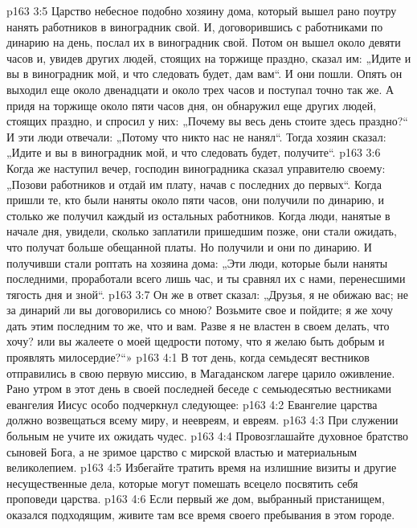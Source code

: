 \vs p163 3:5 Царство небесное подобно хозяину дома, который вышел рано поутру нанять работников в виноградник свой. И, договорившись с работниками по динарию на день, послал их в виноградник свой. Потом он вышел около девяти часов и, увидев других людей, стоящих на торжище праздно, сказал им: „Идите и вы в виноградник мой, и что следовать будет, дам вам“. И они пошли. Опять он выходил еще около двенадцати и около трех часов и поступал точно так же. А придя на торжище около пяти часов дня, он обнаружил еще других людей, стоящих праздно, и спросил у них: „Почему вы весь день стоите здесь праздно?“ И эти люди отвечали: „Потому что никто нас не нанял“. Тогда хозяин сказал: „Идите и вы в виноградник мой, и что следовать будет, получите“.
\vs p163 3:6 Когда же наступил вечер, господин виноградника сказал управителю своему: „Позови работников и отдай им плату, начав с последних до первых“. Когда пришли те, кто были наняты около пяти часов, они получили по динарию, и столько же получил каждый из остальных работников. Когда люди, нанятые в начале дня, увидели, сколько заплатили пришедшим позже, они стали ожидать, что получат больше обещанной платы. Но получили и они по динарию. И получивши стали роптать на хозяина дома: „Эти люди, которые были наняты последними, проработали всего лишь час, и ты сравнял их с нами, перенесшими тягость дня и зной“.
\vs p163 3:7 Он же в ответ сказал: „Друзья, я не обижаю вас; не за динарий ли вы договорились со мною? Возьмите свое и пойдите; я же хочу дать этим последним то же, что и вам. Разве я не властен в своем делать, что хочу? или вы жалеете о моей щедрости потому, что я желаю быть добрым и проявлять милосердие?“»
\vs p163 4:1 В тот день, когда семьдесят вестников отправились в свою первую миссию, в Магаданском лагере царило оживление. Рано утром в этот день в своей последней беседе с семьюдесятью вестниками евангелия Иисус особо подчеркнул следующее:
\vs p163 4:2 \bibnobreakspace Евангелие царства должно возвещаться всему миру, и неевреям, и евреям.
\vs p163 4:3 \pc {}\bibnobreakspace При служении больным не учите их ожидать чудес.
\vs p163 4:4 \pc {}\bibnobreakspace Провозглашайте духовное братство сыновей Бога, а не зримое царство с мирской властью и материальным великолепием.
\vs p163 4:5 \pc {}\bibnobreakspace Избегайте тратить время на излишние визиты и другие несущественные дела, которые могут помешать всецело посвятить себя проповеди царства.
\vs p163 4:6 \pc {}\bibnobreakspace Если первый же дом, выбранный пристанищем, оказался подходящим, живите там все время своего пребывания в этом городе.
